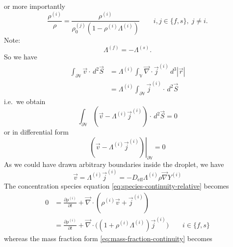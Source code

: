 \documentclass[12pt]{report}
\begin{document}
or more importantly
\begin{equation}
  \frac{\rho^{(i)}}{\rho} =
  \frac{\rho^{(i)}}{\rho^{(j)}_0 (1 - \rho^{(i)} \Lambda^{(i)})}
  \qquad i,j \in \{f,s\}, \; j \ne i.
\end{equation}
Note:
\begin{equation*}
  \Lambda^{(f)} = -\Lambda^{(s)}.
\end{equation*}
So we have
\begin{equation*}
  \begin{aligned}
  \int_{\partial \mathbb{V}}
  \vec{v} \cdot
  \, d^2\vec{S}
  &=
  \Lambda^{(i)}
  \int_{\mathbb{V}}
  \vec{\nabla} \cdot \vec{j}^{(i)}
  \, d^3|\vec{r}| \\
  &=
  \Lambda^{(i)}
  \int_{\partial \mathbb{V}}
  \vec{j}^{(i)} \cdot
  \, d^2\vec{S}
  \end{aligned}
\end{equation*}
i.e.\ we obtain
\begin{equation*}
  \int_{\partial \mathbb{V}}
  (\vec{v} - \Lambda^{(i)} \vec{j}^{(i)})
  \cdot \, d^2\vec{S}
  = 0
\end{equation*}
or in differential form
\begin{equation}
  \left.
  (\vec{v} - \Lambda^{(i)} \vec{j}^{(i)})
  \right|_{\partial \mathbb{V}}
  = 0
\end{equation}
As we could have drawn arbitrary boundaries inside the droplet, we have
\begin{equation}
  \vec{v} =
  \Lambda^{(i)} \vec{j}^{(i)} =
  -D_{\textrm{eff}} \Lambda^{(i)} \rho \vec{\nabla} Y^{(i)}
\end{equation}
The concentration species equation \eqref{eq:species-continuity-relative} becomes
\begin{equation}\label{eq:species-continuity-advection-corrected}
  \begin{aligned}
    0 &=
    \frac{\partial \rho^{(i)}}{\partial t} +
    \vec{\nabla} \cdot
    \left(
    \rho^{(i)} \vec{v} +
    \vec{j}^{(i)}
    \right)
    \\
    &=
    \frac{\partial \rho^{(i)}}{\partial t} +
    \vec{\nabla} \cdot
    \Big(
    (1 + \rho^{(i)} \Lambda^{(i)})
    \vec{j}^{(i)} \Big)
    \qquad i \in \{f,s\}
  \end{aligned}
\end{equation}
whereas the mass fraction form \eqref{eq:mass-fraction-continuity} becomes
\end{document}
